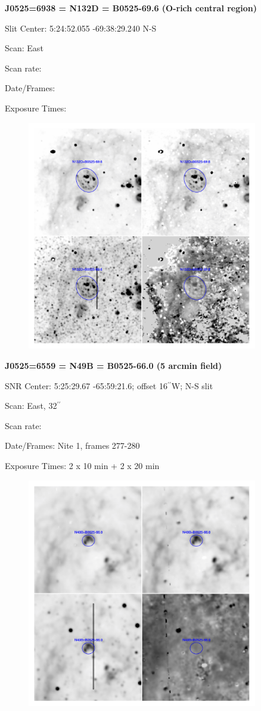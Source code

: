 \documentclass[11pt]{article}
\newcommand{\arcsec}{$^{\prime\prime}$}
\begin{document}
\newpage
{\bf J0525=6938 = N132D = B0525-69.6 (O-rich central region)}  
 
Slit Center:   5:24:52.055   -69:38:29.240 N-S

Scan:  East

Scan rate:  

Date/Frames:

Exposure Times:  

\begin{figure}
\includegraphics[width=10.05cm]{snapshots/N132D.png}
\end{figure}

\newpage
{\bf J0525=6559 = N49B = B0525-66.0 (5 arcmin field)}  
 
SNR Center:   5:25:29.67  -65:59:21.6;     offset 16\arcsec W;  N-S slit

Scan:  East, 32\arcsec

Scan rate:  

Date/Frames:  Nite 1, frames 277-280

Exposure Times:  2 x 10 min  +  2 x 20 min

\begin{figure}
\includegraphics[width=10.05cm]{snapshots/N49B_5arcmin.png}
\end{figure}
\end{document}
